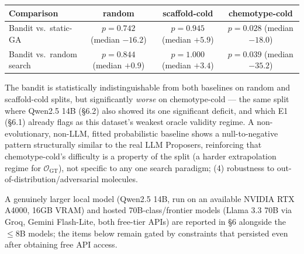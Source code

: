 \documentclass{article}
\begin{document}
\begin{center}
\begin{tabular}{lccc}
\toprule
Comparison & random & scaffold-cold & chemotype-cold \\
\midrule
Bandit vs.\ static-GA & $p=0.742$ (median $-16.2$) & $p=0.945$ (median $+5.9$) & $p=0.028$ (median $-18.0$) \\
Bandit vs.\ random search & $p=0.844$ (median $+0.9$) & $p=1.000$ (median $+3.4$) & $p=0.039$ (median $-35.2$) \\
\bottomrule
\end{tabular}
\end{center}

The bandit is statistically indistinguishable from both baselines on
random and scaffold-cold splits, but significantly \emph{worse} on
chemotype-cold --- the same split where Qwen2.5 14B (\S6.2) also showed
its one significant deficit, and which E1 (\S6.1) already flags as this
dataset's weakest oracle validity regime. A non-evolutionary, non-LLM,
fitted probabilistic baseline shows a null-to-negative pattern
structurally similar to the real LLM Proposers, reinforcing that
chemotype-cold's difficulty is a property of the split (a harder
extrapolation regime for $\mathcal{O}_{\text{GT}}$), not specific to any
one search paradigm; (4) robustness to out-of-distribution/adversarial
molecules.

A genuinely larger local model (Qwen2.5 14B, run on an available NVIDIA
RTX A4000, 16GB VRAM) and hosted 70B-class/frontier models (Llama 3.3 70B
via Groq, Gemini Flash-Lite, both free-tier APIs) are reported in \S6
alongside the $\le$8B models; the items below remain gated by constraints
that persisted even after obtaining free API access.
\end{document}
